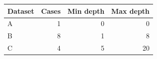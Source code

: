\begin{tabular}{lrrr}
\hline
Dataset & Cases & Min depth & Max depth \\
\hline
A & 1 & 0 & 0 \\
B & 8 & 1 & 8 \\
C & 4 & 5 & 20 \\
\hline
\end{tabular}

